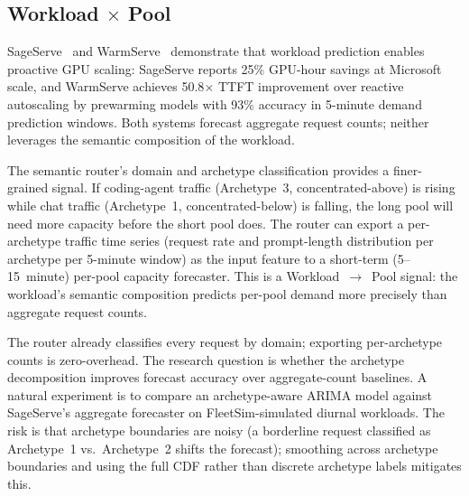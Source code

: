 \subsection{Workload $\times$ Pool}

\begin{opportunity}
\label{opp:proactive-scaling}
SageServe~\cite{jia2025sageserve} and
WarmServe~\cite{warmserve2025} demonstrate that workload prediction
enables proactive GPU scaling: SageServe reports 25\% GPU-hour
savings at Microsoft scale, and WarmServe achieves 50.8$\times$
TTFT improvement over reactive autoscaling by prewarming models with
93\% accuracy in 5-minute demand prediction windows.  Both systems
forecast aggregate request counts; neither leverages the semantic
composition of the workload.

The semantic router's domain and archetype classification provides a
finer-grained signal.  If coding-agent traffic (Archetype~3,
concentrated-above) is rising while chat traffic (Archetype~1,
concentrated-below) is falling, the long pool will need more
capacity before the short pool does.  The router can export a
per-archetype traffic time series (request rate and prompt-length
distribution per archetype per 5-minute window) as the input feature
to a short-term (5--15~minute) per-pool capacity forecaster.  This
is a Workload~$\to$~Pool signal: the workload's semantic composition
predicts per-pool demand more precisely than aggregate request counts.

\begin{frisk}
The router already classifies every request by domain; exporting
per-archetype counts is zero-overhead.  The research question is
whether the archetype decomposition improves forecast accuracy over
aggregate-count baselines.  A natural experiment is to compare an
archetype-aware ARIMA model against SageServe's aggregate forecaster
on FleetSim-simulated diurnal workloads.  The risk is that archetype
boundaries are noisy (a borderline request classified as Archetype~1
vs.\ Archetype~2 shifts the forecast); smoothing across archetype
boundaries and using the full CDF rather than discrete archetype
labels mitigates this.
\end{frisk}
\end{opportunity}



